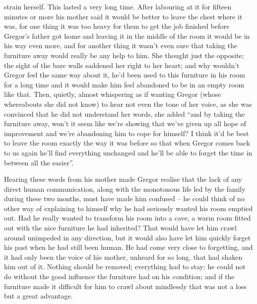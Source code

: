 strain herself. This lasted a very long time. After labouring at it for
fifteen minutes or more his mother said it would be better to leave the
chest where it was, for one thing it was too heavy for them to get the
job finished before Gregor’s father got home and leaving it in the
middle of the room it would be in his way even more, and for another
thing it wasn’t even sure that taking the furniture away would really
be any help to him. She thought just the opposite; the sight of the
bare walls saddened her right to her heart; and why wouldn’t Gregor
feel the same way about it, he’d been used to this furniture in his
room for a long time and it would make him feel abandoned to be in an
empty room like that. Then, quietly, almost whispering as if wanting
Gregor (whose whereabouts she did not know) to hear not even the tone
of her voice, as she was convinced that he did not understand her
words, she added “and by taking the furniture away, won’t it seem like
we’re showing that we’ve given up all hope of improvement and we’re
abandoning him to cope for himself? I think it’d be best to leave the
room exactly the way it was before so that when Gregor comes back to us
again he’ll find everything unchanged and he’ll be able to forget the
time in between all the easier”.

Hearing these words from his mother made Gregor realise that the lack
of any direct human communication, along with the monotonous life led
by the family during these two months, must have made him confused – he
could think of no other way of explaining to himself why he had
seriously wanted his room emptied out. Had he really wanted to
transform his room into a cave, a warm room fitted out with the nice
furniture he had inherited? That would have let him crawl around
unimpeded in any direction, but it would also have let him quickly
forget his past when he had still been human. He had come very close to
forgetting, and it had only been the voice of his mother, unheard for
so long, that had shaken him out of it. Nothing should be removed;
everything had to stay; he could not do without the good influence the
furniture had on his condition; and if the furniture made it difficult
for him to crawl about mindlessly that was not a loss but a great
advantage.

